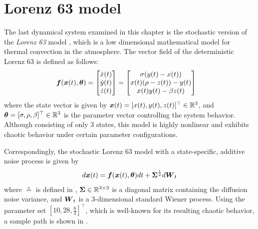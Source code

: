 \vspace{\baselineskip}
\section{Lorenz 63 model}
\label{sec-lorenz-63}

The last dynamical system examined in this chapter is the stochastic version of the \emph{Lorenz 63} model \citep{lorenz1963deterministic}, which is a low dimensional mathematical model for thermal convection in the atmosphere.
The vector field of the deterministic Lorenz 63 is defined as follows:
\begin{align}
    \boldsymbol{f}(\boldsymbol{x}(t), \boldsymbol{\theta})
    & =
    \begin{bmatrix}
        \dot{x}(t)
        \\ 
        \dot{y}(t)
        \\
        \dot{z}(t)
    \end{bmatrix}
    =
    \begin{bmatrix}
        \sigma(y(t) - x(t))
        \\
        x(t)(\rho - z(t)) - y(t)
        \\
        x(t)y(t) - \beta z(t)
    \end{bmatrix}
    \label{eq-lorenz-63-odes}
\end{align}
where the state vector is given by $\boldsymbol{x}(t) = [x(t), y(t), z(t)]^\top \in \mathbb{R}^3$, and $\boldsymbol{\theta} = [\sigma, \rho, \beta]^\top \in \mathbb{R}^3$ is the parameter vector controlling the system behavior.
Although consisting of only 3 states, this model is highly nonlinear and exhibits chaotic behavior under certain parameter configurations.

Correspondingly, the stochastic Lorenz 63 model with a state-specific, additive noise process is given by
\begin{align}
    d\boldsymbol{x}(t) = \boldsymbol{f}(\boldsymbol{x}(t), \boldsymbol{\theta}) dt + \boldsymbol{\Sigma}^\frac{1}{2}d\boldsymbol{W}_t
\end{align}
where $\sdef$ is defined in , $\boldsymbol{\Sigma} \in \mathbb{R}^{3 \times 3}$ is a diagonal matrix containing the diffusion noise variance, and $\boldsymbol{W}_t$ is a 3-dimensional standard Wiener process.
Using the parameter set $[10, 28, \frac{8}{3}]^\top$, which is well-known for its resulting chaotic behavior, a sample path is shown in .

